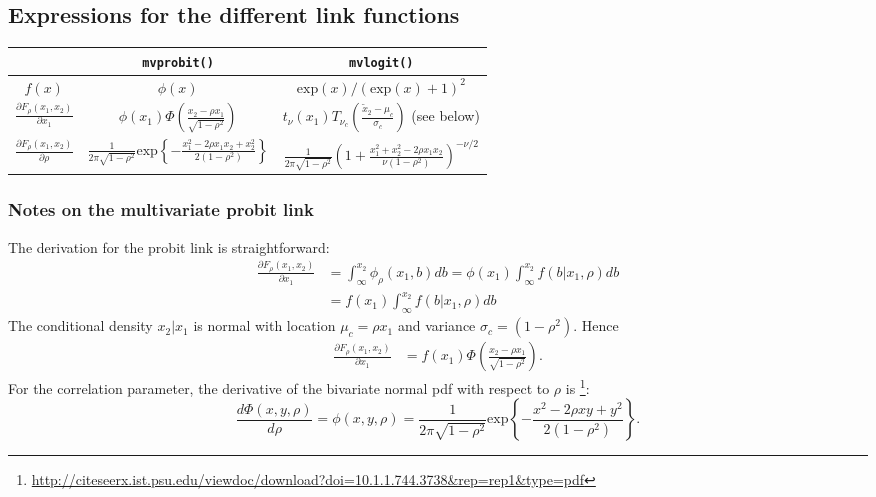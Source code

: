 \documentclass[a4paper,fleqn]{article}
\newcommand{\EXP}{\mathrm{exp}}
\begin{document}
\subsection{Expressions for the different link functions}

\begin{tabular}{c|c|c}
& \texttt{mvprobit()}&\texttt{mvlogit()}\\
\hline
$f(x)$& $\phi(x)$ & $\EXP(x)/(\EXP(x) + 1)^2$\\
$\frac{\partial F_\rho(x_1,x_2)}{\partial x_1}$& $\phi(x_1)\Phi\left(\frac{x_2-\rho x_1}{\sqrt{1-\rho^2}}\right)$ &$t_\nu(x_1)  T_{\nu_c}\left(\frac{\tilde x_2 - \mu_c}{\sigma_c}\right)$ (see below)  \\
$\frac{\partial F_\rho(x_1,x_2)}{\partial \rho}$& $\frac{1}{2\pi \sqrt{1-\rho^2}}\EXP\left\{-\frac{x_1^2 - 2\rho x_1 x_2 + x_2^2}{2(1-\rho^2)} \right\}$&$
\frac{1}{2\pi\sqrt{1-\rho^2}}\left(1 + \frac{x_1^2 + x_2^2 - 2\rho x_1x_2}{\nu(1-\rho^2)} \right)^{-\nu/2}$\\
\end{tabular}

\subsubsection{Notes on the multivariate probit link}
The derivation for the probit link is straightforward:
\begin{align*}
\frac{\partial F_\rho(x_1, x_2)}{\partial x_1} &=\int_{\infty}^{x_2}\phi_\rho(x_1, b) db=\phi(x_1)\int_{\infty}^{x_2}f(b|x_1, \rho) db\\\nonumber
&=f(x_1) \int_{\infty}^{x_2}f(b|x_1, \rho)db
\end{align*}
The conditional density $x_2|x_1$ is normal
with location $\mu_c = \rho x_1$ and variance $\sigma_c =  (1 - \rho^2)$. Hence
\begin{align*}
\frac{\partial F_\rho(x_1, x_2)}{\partial x_1}
&=f(x_1) \Phi\left(\frac{x_2-\rho x_1}{\sqrt{1-\rho^2}}\right).
\end{align*}
For the correlation parameter, the derivative of the bivariate normal pdf with respect to $\rho$ is \footnote{\url{http://citeseerx.ist.psu.edu/viewdoc/download?doi=10.1.1.744.3738&rep=rep1&type=pdf}}:
$$ \frac{d\Phi(x, y, \rho)}{d\rho} = \phi(x, y, \rho)= \frac{1}{2\pi \sqrt{1-\rho^2}}\mathrm{exp}\left\{-\frac{x^2 - 2\rho x y + y^2}{2(1-\rho^2)} \right\}.$$
\end{document}

